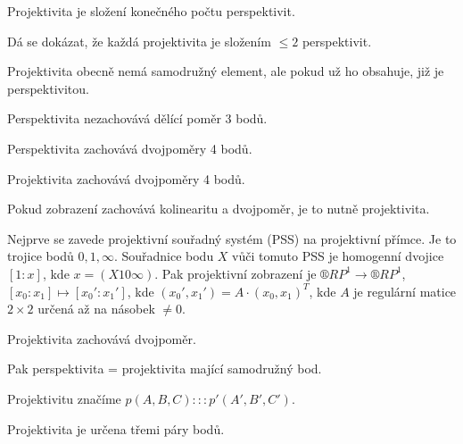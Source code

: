 \documentclass[12pt]{article}					%
\begin{document}
\begin{definice}[Projektivita]
	Projektivita je složení konečného počtu perspektivit.

	\begin{poznamkain}
		Dá se dokázat, že každá projektivita je složením $≤ 2$ perspektivit.
	\end{poznamkain}
\end{definice}

\begin{dusledek}
	Projektivita obecně nemá samodružný element, ale pokud už ho obsahuje, již je perspektivitou.
\end{dusledek}

\begin{upozorneni}
	Perspektivita nezachovává dělící poměr 3 bodů.
\end{upozorneni}

\begin{tvrzeni}
	Perspektivita zachovává dvojpoměry 4 bodů.
\end{tvrzeni}

\begin{dusledek}
	Projektivita zachovává dvojpoměry 4 bodů.
\end{dusledek}

\begin{tvrzeni}
	Pokud zobrazení zachovává kolinearitu a dvojpoměr, je to nutně projektivita.
\end{tvrzeni}

\begin{poznamka}
	Nejprve se zavede projektivní souřadný systém (PSS) na projektivní přímce. Je to trojice bodů $0, 1, ∞$. Souřadnice bodu $X$ vůči tomuto PSS je homogenní dvojice $[1:x]$, kde $x = (X 1 0 ∞)$. Pak projektivní zobrazení je $®RP^1 \rightarrow ®RP^1$, $[x_0:x_1] \mapsto [x_0':x_1']$, kde $(x_0', x_1') = A·(x_0, x_1)^T$, kde $A$ je regulární matice $2 \times 2$ určená až na násobek $≠0$.

	\begin{dusledekin}
		Projektivita zachovává dvojpoměr.
	\end{dusledekin}

	Pak perspektivita = projektivita mající samodružný bod.
\end{poznamka}

\begin{poznamka}
	Projektivitu značíme $p(A, B, C) ::: p'(A', B', C')$.

	\begin{poznamkain}
		Projektivita je určena třemi páry bodů.
	\end{poznamkain}
\end{poznamka}
\end{document}
